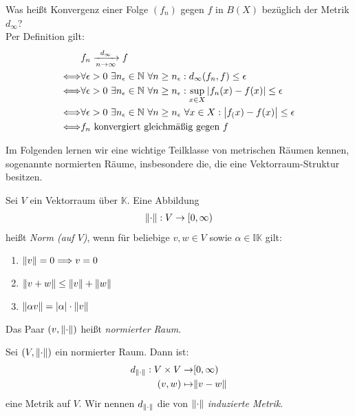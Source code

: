 \begin{Beispiel}{
	Was heißt Konvergenz einer Folge $(f_n)$ gegen $f$ in $B(X)$ bezüglich der 
	Metrik $d_\infty$?\\
	Per Definition gilt:
	\begin{align*}
		& f_n \xrightarrow[n \to \infty]{d_\infty} f \\
		\Longleftrightarrow & \forall \epsilon > 0 \text{ } \exists n_\epsilon \in \mathbb{N} \text{ }\forall n \geq 
			n_\epsilon: d_\infty(f_n,f) \leq \epsilon \\
		\Longleftrightarrow & \forall \epsilon > 0 \text{ } \exists n_\epsilon \in \mathbb{N} \text{ }
			\forall n \geq  n_\epsilon: \sup_{x \in X} \abs{f_n(x)-f(x)} \leq 
			\epsilon \\
		\Longleftrightarrow & \forall \epsilon > 0 \text{ } \exists n_\epsilon \in 
			\mathbb{N} \text{ }\forall n \geq n_\epsilon \text{ }\forall x \in X: 
			\abs{f_(x) -f(x)} \leq \epsilon \\
		\Longleftrightarrow & f_n \text{ konvergiert gleichmäßig gegen } f
	\end{align*}
}\end{Beispiel}

Im Folgenden lernen wir eine wichtige Teilklasse von metrischen Räumen kennen, sogenannte
normierten Räume, insbesondere die, die eine Vektorraum-Struktur besitzen.

\begin{Definition}{%
	Sei $V$ ein Vektorraum über $\mathbb{K}$. Eine Abbildung 
	\begin{align*}
		\norm{\cdot} : V \rightarrow [0, \infty)
	\end{align*}
	heißt \emph{Norm (auf $V$)}, wenn für beliebige $v,w\in V$ sowie $\alpha \in \mathbb{IK}$ gilt:
	\begin{enumerate}
		\item \label{vl_20_stp_1} $\norm{v} = 0 \Longrightarrow v = 0$
		\item \label{vl_20_stp_2} $ \norm{v + w} \leq \norm{v} + \norm{w}$
		\item \label{vl_20_stp_3} $\norm{\alpha v} = \abs{\alpha}\cdot\norm{v}$
	\end{enumerate}
	Das Paar $(v, \norm{\cdot})$ heißt \emph{normierter Raum}.
}\end{Definition}

\begin{Definition}{%
	Sei $(V, \norm{\cdot})$ ein normierter Raum. Dann ist:
	\begin{align*}
		d_{\norm{\cdot}} : V \times V \to & [0, \infty) \\
			(v,w) \mapsto & \norm{v-w}
	\end{align*}
	eine Metrik auf $V$. Wir nennen $d_{\norm{\cdot}}$ die von $\norm{\cdot}$ 
	\emph{induzierte Metrik}.
}\end{Definition}


